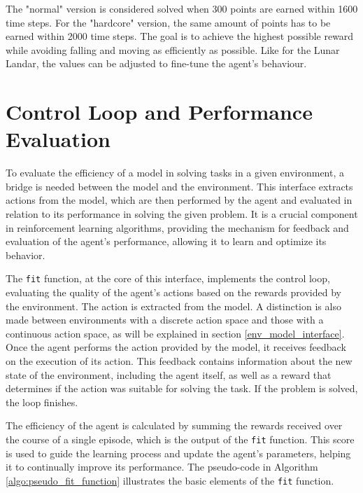 The "normal" version is considered solved when 300 points are earned within 1600 time steps. For the "hardcore" version, the same amount of points has to be earned within 2000 time steps. The goal is to achieve the highest possible reward while avoiding falling and moving as efficiently as possible. Like for the Lunar Landar, the values can be adjusted to fine-tune the agent's behaviour.

\section{Control Loop and Performance Evaluation}

To evaluate the efficiency of a model in solving tasks in a given environment, a bridge is needed between the model and the environment. This interface extracts actions from the model, which are then performed by the agent and evaluated in relation to its performance in solving the given problem. It is a crucial component in reinforcement learning algorithms, providing the mechanism for feedback and evaluation of the agent's performance, allowing it to learn and optimize its behavior.

The \texttt{fit} function, at the core of this interface, implements the control loop, evaluating the quality of the agent's actions based on the rewards provided by the environment. The action is extracted from the model. A distinction is also made between environments with a discrete action space and those with a continuous action space, as will be explained in section \ref{env_model_interface}. Once the agent performs the action provided by the model, it receives feedback on the execution of its action. This feedback contains information about the new state of the environment, including the agent itself, as well as a reward that determines if the action was suitable for solving the task. If the problem is solved, the loop finishes.

The efficiency of the agent is calculated by summing the rewards received over the course of a single episode, which is the output of the \texttt{fit} function. This score is used to guide the learning process and update the agent's parameters, helping it to continually improve its performance. The pseudo-code in Algorithm \ref{algo:pseudo_fit_function} illustrates the basic elements of the \texttt{fit} function.






